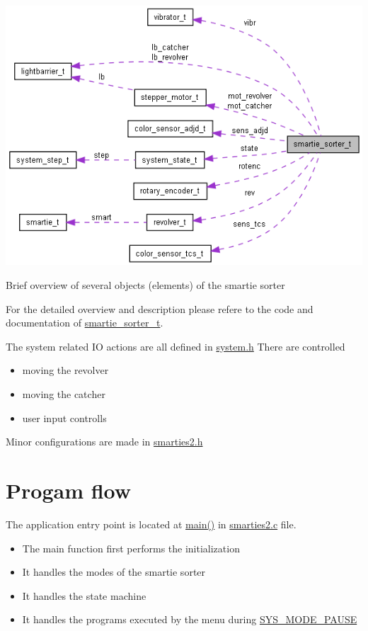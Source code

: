  \begin{Image}
\begin{center}
\includegraphics[width=15cm]{structsmartie__sorter__t__coll__graph.png}\caption{Brief overview of several objects (elements) of the smartie sorter}
\end{center}
\end{Image}


For the detailed overview and description please refere to the code and documentation of \hyperlink{structsmartie__sorter__t}{smartie\_\-sorter\_\-t}.

The system related IO actions are all defined in \hyperlink{system_8h}{system.h} There are controlled\begin{itemize}
\item moving the revolver\item moving the catcher\item user input controlls\end{itemize}


Minor configurations are made in \hyperlink{smarties2_8h}{smarties2.h}\hypertarget{index_prog_flow}{}\section{Progam flow}\label{index_prog_flow}
The application entry point is located at \hyperlink{smarties2_8c_840291bc02cba5474a4cb46a9b9566fe}{main()} in \hyperlink{smarties2_8c}{smarties2.c} file.\begin{itemize}
\item The main function first performs the initialization\item It handles the modes of the smartie sorter\item It handles the state machine\item It handles the programs executed by the menu during \hyperlink{system_8h_6e4cea4b6246f491c526211f5405627df1c8a041b6d3d46002d02ed0645a8ba2}{SYS\_\-MODE\_\-PAUSE}\end{itemize}


